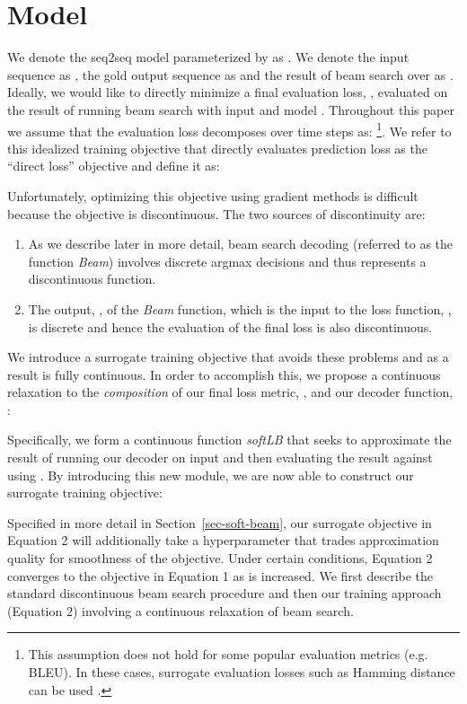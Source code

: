 \documentclass[letterpaper]{article} \usepackage{aaai18}  \usepackage{times}  \usepackage{helvet}  \usepackage{courier}  \usepackage{url}  \usepackage{graphicx}  \frenchspacing
\begin{document}
\section{Model}

We denote the seq2seq model parameterized by  as . We denote the input sequence as , the gold output sequence as  and the result of beam search over  as . Ideally, we would like to directly minimize a final evaluation loss, , evaluated on the result of running beam search with input  and model . Throughout this paper we assume that the evaluation loss decomposes over time steps  as: \footnote{This assumption does not hold  for some popular evaluation metrics (e.g. BLEU). In these cases, surrogate evaluation losses such as Hamming distance can be used
.}. 
We refer to this idealized training objective that directly evaluates prediction loss as the ``direct loss'' objective and define it as:

Unfortunately, optimizing this objective using gradient methods is difficult because the objective is discontinuous. The two sources of discontinuity are:
\begin{enumerate}
\item As we describe later in more detail, beam search decoding (referred to as the function \textit{Beam}) involves discrete argmax decisions and thus represents a discontinuous function.
\item The output, , of the \textit{Beam} function, which is the input to the loss function, , is discrete and hence the evaluation of the final loss is also discontinuous.
\end{enumerate}
We introduce a surrogate training objective that avoids these problems and as a result is fully continuous. In order to accomplish this, we propose a continuous relaxation to the \emph{composition} of our final loss metric, , and our decoder function, :

Specifically, we form a continuous function \textit{softLB} that seeks to approximate the result of running our decoder on input  and then evaluating the result against  using .
By introducing this new module, we are now able to construct our surrogate training objective:


Specified in more detail in Section~\ref{sec-soft-beam}, our surrogate objective in Equation 2 will additionally take a hyperparameter  that trades approximation quality for smoothness of the objective. Under certain conditions, Equation 2 converges to the objective in Equation 1 as  is increased. We first describe the standard discontinuous beam search procedure and then our training approach (Equation 2) involving a continuous relaxation of beam search.
\end{document}
